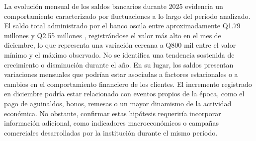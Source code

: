La evolución mensual de los saldos bancarios durante 2025 evidencia un comportamiento caracterizado por fluctuaciones a lo largo del período analizado. El saldo total administrado por el banco oscila entre aproximadamente
Q1.79 millones
y
Q2.55 millones
, registrándose el valor más alto en el mes de diciembre, lo que representa una variación cercana a
Q800 mil
entre el valor mínimo y el máximo observado.
No se identifica una tendencia sostenida de crecimiento o disminución durante el año. En su lugar, los saldos presentan variaciones mensuales que podrían estar asociadas a factores estacionales o a cambios en el comportamiento financiero de los clientes.
El incremento registrado en diciembre podría estar relacionado con eventos propios de la época, como el pago de aguinaldos, bonos, remesas o un mayor dinamismo de la actividad económica. No obstante, confirmar estas hipótesis requeriría incorporar información adicional, como indicadores macroeconómicos o campañas comerciales desarrolladas por la institución durante el mismo período.
